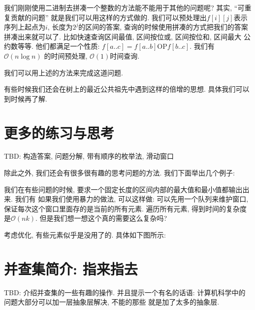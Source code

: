   我们刚刚使用二进制去拼凑一个整数的方法能不能用于其他的问题呢? 其实, ``可重复贡献的问题''
就是我们可以用这样的方式做的. 我们可以预处理出$f[i][j]$表示序列上起点为$i$, 长度为$2^j$的区间的答案, 
查询的时候使用拼凑的方式把我们的答案拼凑出来就可以了. 比如快速查询区间最值, 区间按位或, 区间按位和, 区间最大
公约数等等. 他们都满足一个性质: $f[a..c] = f[a..b] \text{OP} f[b..c]$. 我们有$\mathcal O(n\log n)$
的时间预处理, $\mathcal O(1)$时间查询. 

 我们可以用上述的方法来完成这道问题. 

有些时候我们还会在树上的最近公共祖先中遇到这样的倍增的思想. 具体我们可以到时候再了解. 

\section{更多的练习与思考}

TBD: 构造答案, 问题分解, 带有顺序的枚举法, 滑动窗口

除此之外, 我们还会有很多很有趣的思考问题的方法. 我们下面举出几个例子: 

 我们在有些问题的时候, 要求一个固定长度的区间内部的最大值和最小值都输出出来. 我们有
如果我们使用暴力的做法, 可以这样做: 可以先用一个队列来维护窗口, 保证每次这个窗口里面存的是当前的所有元素. 
遍历所有元素, 得到时间的复杂度是$\mathcal O(nk)$. 但是我们想一想这个真的需要这么复杂吗? 

考虑优化, 有些元素似乎是没用了的. 具体如下图所示: 


\section{并查集简介: 指来指去}

TBD: 介绍并查集的一些有趣的操作. 并且提示一个有名的话语: 
计算机科学中的问题大部分可以加一层抽象层解决, 不能的那些
就是加了太多的抽象层. 